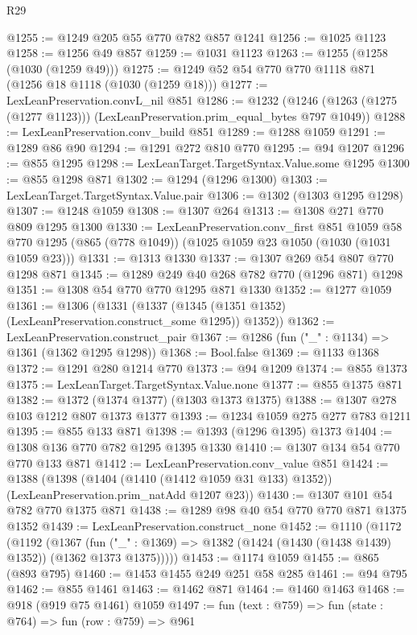 \begin{lexlean}{R29}
\begin{coremodule}
@1255 := @1249 @205 @55 @770 @782 @857 @1241
@1256 := @1025 @1123
@1258 := @1256 @49 @857
@1259 := @1031 @1123
@1263 := @1255 (@1258 (@1030 (@1259 @49)))
@1275 := @1249 @52 @54 @770 @770 @1118 @871 (@1256 @18 @1118 (@1030 (@1259 @18)))
@1277 := LexLeanPreservation.convL_nil @851
@1286 := @1232
    (@1246 (@1263 (@1275 (@1277 @1123))) (LexLeanPreservation.prim_equal_bytes @797 @1049))
@1288 := LexLeanPreservation.conv_build @851
@1289 := @1288 @1059
@1291 := @1289 @86 @90
@1294 := @1291 @272 @810 @770
@1295 := @94 @1207
@1296 := @855 @1295
@1298 := LexLeanTarget.TargetSyntax.Value.some @1295
@1300 := @855 @1298 @871
@1302 := @1294 (@1296 @1300)
@1303 := LexLeanTarget.TargetSyntax.Value.pair
@1306 := @1302 (@1303 @1295 @1298)
@1307 := @1248 @1059
@1308 := @1307 @264
@1313 := @1308 @271 @770 @809 @1295 @1300
@1330 := LexLeanPreservation.conv_first
    @851
    @1059
    @58
    @770
    @1295
    (@865 (@778 @1049))
    (@1025 @1059 @23 @1050 (@1030 (@1031 @1059 @23)))
@1331 := @1313 @1330
@1337 := @1307 @269 @54 @807 @770 @1298 @871
@1345 := @1289 @249 @40 @268 @782 @770 (@1296 @871) @1298
@1351 := @1308 @54 @770 @770 @1295 @871 @1330
@1352 := @1277 @1059
@1361 := @1306
    (@1331 (@1337 (@1345 (@1351 @1352) (LexLeanPreservation.construct_some @1295)) @1352))
@1362 := LexLeanPreservation.construct_pair
@1367 := @1286 (fun ("_" : @1134) => @1361 (@1362 @1295 @1298))
@1368 := Bool.false
@1369 := @1133 @1368
@1372 := @1291 @280 @1214 @770
@1373 := @94 @1209
@1374 := @855 @1373
@1375 := LexLeanTarget.TargetSyntax.Value.none
@1377 := @855 @1375 @871
@1382 := @1372 (@1374 @1377) (@1303 @1373 @1375)
@1388 := @1307 @278 @103 @1212 @807 @1373 @1377
@1393 := @1234 @1059 @275 @277 @783 @1211
@1395 := @855 @133 @871
@1398 := @1393 (@1296 @1395) @1373
@1404 := @1308 @136 @770 @782 @1295 @1395 @1330
@1410 := @1307 @134 @54 @770 @770 @133 @871
@1412 := LexLeanPreservation.conv_value @851
@1424 := @1388
    (@1398 (@1404 (@1410 (@1412 @1059 @31 @133) @1352)) (LexLeanPreservation.prim_natAdd @1207 @23))
@1430 := @1307 @101 @54 @782 @770 @1375 @871
@1438 := @1289 @98 @40 @54 @770 @770 @871 @1375 @1352
@1439 := LexLeanPreservation.construct_none
@1452 := @1110
    (@1172
      (@1192
        (@1367
          (fun ("_" : @1369) => @1382 (@1424 (@1430 (@1438 @1439) @1352)) (@1362 @1373 @1375)))))
@1453 := @1174 @1059
@1455 := @865 (@893 @795)
@1460 := @1453 @1455 @249 @251 @58 @285
@1461 := @94 @795
@1462 := @855 @1461
@1463 := @1462 @871
@1464 := @1460 @1463
@1468 := @918 (@919 @75 @1461) @1059
@1497 := fun (text : @759) =>
  fun (state : @764) =>
  fun (row : @759) =>
  @961

\end{coremodule}
\end{lexlean}
